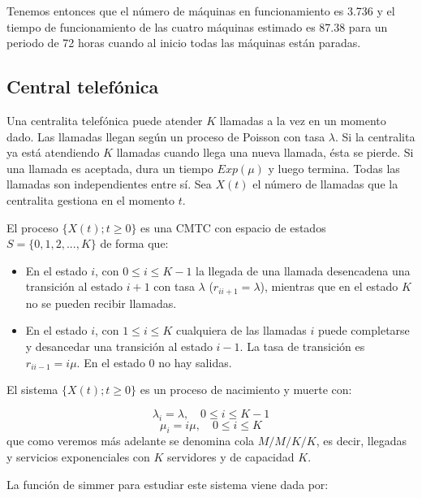 \documentclass[
]{book}
\theoremstyle{definition}
\theoremstyle{definition}
\theoremstyle{definition}
\theoremstyle{definition}
\theoremstyle{remark}
\begin{document}
Tenemos entonces que el número de máquinas en funcionamiento es 3.736 y el tiempo de funcionamiento de las cuatro máquinas estimado es 87.38 para un periodo de 72 horas cuando al inicio todas las máquinas están paradas.

\hypertarget{central-telefuxf3nica}{%
\subsection{Central telefónica}\label{central-telefuxf3nica}}

Una centralita telefónica puede atender \(K\) llamadas a la vez en un momento dado. Las llamadas llegan según un proceso de Poisson con tasa \(\lambda\). Si la centralita ya está atendiendo \(K\) llamadas cuando llega una nueva llamada, ésta se pierde. Si una llamada es aceptada, dura un tiempo \(Exp(\mu)\) y luego termina. Todas las llamadas son independientes entre sí. Sea \(X(t)\) el número de llamadas que la centralita gestiona en el momento \(t\).

El proceso \(\{X(t); t \geq 0\}\) es una CMTC con espacio de estados \(S = \{0, 1, 2,...,K\}\) de forma que:

\begin{itemize}
\item
  En el estado \(i\), con \(0 \leq i \leq K-1\) la llegada de una llamada desencadena una transición al estado \(i+1\) con tasa \(\lambda\) (\(r_{i i+1} = \lambda\)), mientras que en el estado \(K\) no se pueden recibir llamadas.
\item
  En el estado \(i\), con \(1 \leq i \leq K\) cualquiera de las llamadas \(i\) puede completarse y desancedar una transición al estado \(i-1\). La tasa de transición es \(r_{i i-1} = i\mu\). En el estado 0 no hay salidas.
\end{itemize}

El sistema \(\{X(t); t \geq 0\}\) es un proceso de nacimiento y muerte con:

\[\lambda_i = \lambda, \quad 0 \leq i \leq K-1\] \[\mu_i = i\mu, \quad 0 \leq i \leq K\] que como veremos más adelante se denomina cola \(M/M/K/K\), es decir, llegadas y servicios exponenciales con \(K\) servidores y de capacidad \(K\).

La función de simmer para estudiar este sistema viene dada por:
\end{document}
